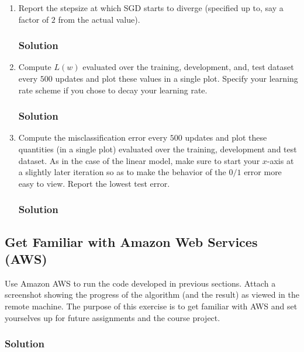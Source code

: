 \documentclass[letterpaper,11pt]{article}
\begin{document}
\begin{enumerate}
\item Report the stepsize at which SGD starts to diverge (specified up to, say a
  factor of $2$ from the actual value).

    \subsubsection*{Solution}

  \item Compute $L(w)$ evaluated over the training, development, and, test
    dataset every $500$ updates and plot these values in a single plot. Specify
    your learning rate scheme if you chose to decay your learning rate.

    \subsubsection*{Solution}
  \item Compute the misclassification error every $500$ updates and plot these
    quantities (in a single plot) evaluated over the training, development and
    test dataset. As in the case of the linear model, make sure to start your
    $x$-axis at a slightly later iteration so as to make the behavior of the
    $0/1$ error more easy to view. Report the lowest test error.
    
    \subsubsection*{Solution}

  
\end{enumerate}


\subsection*{Get Familiar with Amazon Web Services (AWS)}

Use Amazon AWS to run the code developed in previous sections. Attach a
screenshot showing the progress of the algorithm (and the result) as viewed in
the remote machine. The purpose of this exercise is to get familiar with AWS
and set yourselves up for future assignments and the course project.

\subsubsection*{Solution}
\end{document}
